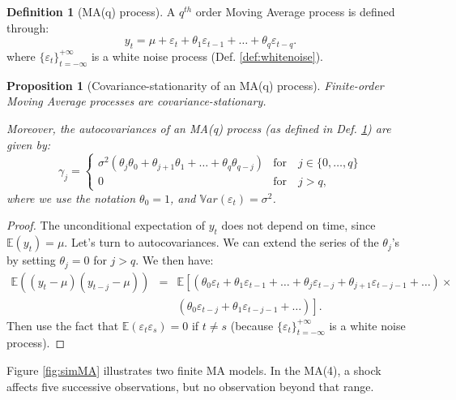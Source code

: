 \documentclass[
  11pt,
]{book}
\newtheorem{proposition}{Proposition}[chapter]
\theoremstyle{definition}
\newtheorem{definition}{Definition}[chapter]
\theoremstyle{definition}
\theoremstyle{definition}
\theoremstyle{definition}
\theoremstyle{remark}
\begin{document}
\begin{definition}[MA(q) process]
\protect\hypertarget{def:MAq}{}\label{def:MAq}A \(q^{th}\) order Moving Average process is defined through:
\[
y_t = \mu + \varepsilon_t + \theta_1 \varepsilon_{t-1} + \dots + \theta_q \varepsilon_{t-q}.
\]
where \(\{\varepsilon_t\}_{t = -\infty}^{+\infty}\) is a white noise process (Def. \ref{def:whitenoise}).
\end{definition}

\begin{proposition}[Covariance-stationarity of an MA(q) process]
\protect\hypertarget{prp:covMAq}{}\label{prp:covMAq}Finite-order Moving Average processes are covariance-stationary.

Moreover, the autocovariances of an MA(q) process (as defined in Def. \ref{def:MAq}) are given by:
\begin{equation}
\gamma_j = \left\{ \begin{array}{ll} \sigma^2(\theta_j\theta_0 + \theta_{j+1}\theta_{1} +  \dots + \theta_{q}\theta_{q-j}) &\mbox{for} \quad j \in \{0,\dots,q\} \\ 0 &\mbox{for} \quad j>q, \end{array} \right.\label{eq:autocovMA}
\end{equation}
where we use the notation \(\theta_0=1\), and \(\mathbb{V}ar(\varepsilon_t)=\sigma^2\).
\end{proposition}

\begin{proof}
The unconditional expectation of \(y_t\) does not depend on time, since \(\mathbb{E}(y_t)=\mu\). Let's turn to autocovariances. We can extend the series of the \(\theta_j\)'s by setting \(\theta_j=0\) for \(j>q\). We then have:
\begin{eqnarray*}
\mathbb{E}((y_t-\mu)(y_{t-j}-\mu)) &=& \mathbb{E}\left[(\theta_0 \varepsilon_t +\theta_1 \varepsilon_{t-1} + \dots +\theta_j \varepsilon_{t-j}+\theta_{j+1} \varepsilon_{t-j-1} + \dots) \right.\times \\
&&\left. (\theta_0 \varepsilon_{t-j} +\theta_1 \varepsilon_{t-j-1} + \dots)\right].
\end{eqnarray*}
Then use the fact that \(\mathbb{E}(\varepsilon_t\varepsilon_s)=0\) if \(t \ne s\) (because \(\{\varepsilon_t\}_{t = -\infty}^{+\infty}\) is a white noise process).
\end{proof}

Figure \ref{fig:simMA} illustrates two finite MA models. In the MA(4), a shock affects five successive observations, but no observation beyond that range.
\end{document}
